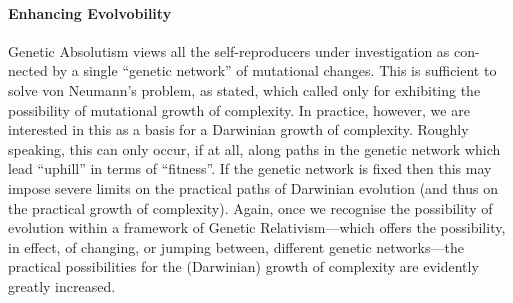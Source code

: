 \documentclass[12pt]{paper}
\begin{document}
 
 
\paragraph{Enhancing Evolvobility}
 Genetic Absolutism views all the self-reproducers under investigation as con-
nected by a single ``genetic network'' of mutational changes. This is sufficient to solve von
Neumann’s problem, as stated, which called only for exhibiting the possibility of mutational
growth of complexity. In practice, however, we are interested in this as a basis for a Darwinian 
growth of complexity. Roughly speaking, this can only occur, if at all, along paths
in the genetic network which lead ``uphill'' in terms of ``fitness''. If the genetic network is
fixed then this may impose severe limits on the practical paths of Darwinian evolution (and
thus on the practical growth of complexity). Again, once we recognise the possibility of
evolution within a framework of Genetic Relativism—which offers the possibility, in effect,
of changing, or jumping between, different genetic networks—the practical possibilities for
the (Darwinian) growth of complexity are evidently greatly increased.\footnotemark[1]


 

  
  
 
\end{document}
